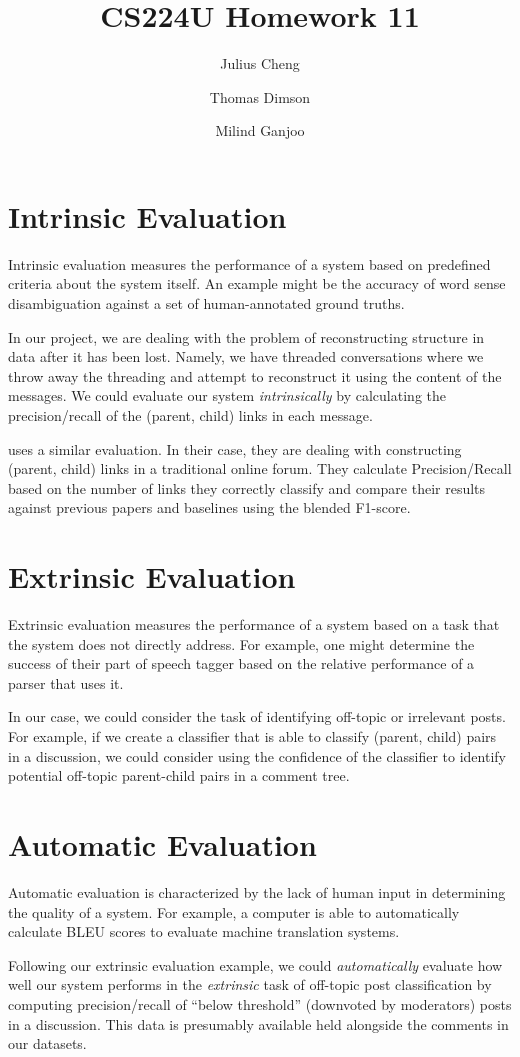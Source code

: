 \documentclass{article}
\title{CS224U Homework 11}
\author{
Julius Cheng \and
Thomas Dimson \and
Milind Ganjoo
}
\begin{document}
\maketitle

\section*{Intrinsic Evaluation}
Intrinsic evaluation measures the performance of a system
based on predefined criteria about the system itself. An example
might be the accuracy of word sense disambiguation against
a set of human-annotated ground truths. 

In our project, we are dealing with the problem of reconstructing
structure in data after it has been lost. Namely, we have threaded
conversations where we throw away the threading and attempt to 
reconstruct it using the content of the messages. We could evaluate
our system \textit{intrinsically} by calculating the precision/recall of the 
(parent, child) links in each message.

\cite{Aumayr2011a} uses a similar evaluation. In their case,
they are dealing with constructing (parent, child) links in a traditional
online forum. They calculate Precision/Recall based on the number of 
links they correctly classify and compare their results against previous
papers and baselines using the blended F1-score.

\section*{Extrinsic Evaluation}
Extrinsic evaluation measures the performance of a system
based on a task that the system does not directly address. For example,
one might determine the success of their part of speech tagger
based on the relative performance of a parser that uses it.

In our
case, we could consider the task of identifying off-topic or 
irrelevant posts. For example, if we create a classifier
that is able to classify (parent, child) pairs in a discussion, we could consider
using the confidence of the classifier to identify potential
off-topic parent-child pairs in a comment tree. 

\section*{Automatic Evaluation}
Automatic evaluation is characterized by the lack of human
input in determining the quality of a system. For example, a computer
is able to automatically calculate BLEU scores to evaluate machine
translation systems.

Following our extrinsic evaluation example, we could \textit{automatically}
evaluate how well our system performs in the \textit{extrinsic} task 
of off-topic post classification by computing precision/recall
of ``below threshold'' (downvoted by moderators) posts in a discussion. This
data is presumably available held alongside the comments in our datasets.


{} 

\end{document}
